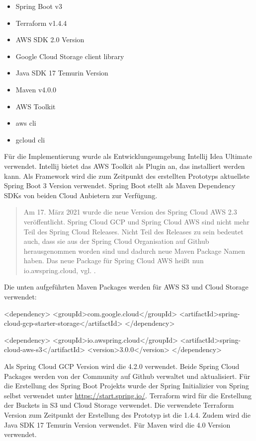 \begin{itemize}
	\item Spring Boot v3
	\item Terraform v1.4.4
	\item AWS SDK 2.0 Version
	\item Google Cloud Storage client library
	\item Java SDK 17 Temurin Version
	\item Maven v4.0.0
	\item AWS Toolkit
	\item aws cli
	\item gcloud cli
\end{itemize}

Für die Implementierung wurde als Entwicklungsumgebung Intellij Idea Ultimate verwendet. Intellij bietet das AWS Toolkit als Plugin an, das installiert werden kann. Als Framework wird die zum Zeitpunkt des erstellten Prototyps aktuellste Spring Boot 3 Version verwendet. Spring Boot stellt als Maven Dependency SDKs von beiden Cloud Anbietern zur Verfügung.

\begin{quote}
	Am 17. März 2021 wurde die neue Version des Spring Cloud AWS 2.3 veröffentlicht. Spring Cloud GCP und Spring Cloud AWS sind nicht mehr Teil des Spring Cloud Releases. Nicht Teil des Releases zu sein bedeutet auch, dass sie aus der Spring Cloud Organisation auf Github herausgenommen worden sind und dadurch neue Maven Package Namen haben. Das neue Package für Spring Cloud AWS heißt nun \glqq io.awspring.cloud\grqq, vgl. \cite{spring-cloud-announce}. 
\end{quote}

Die unten aufgeführten Maven Packages werden für AWS S3 und Cloud Storage verwendet:

\begin{code}
	<dependency>
        	<groupId>com.google.cloud</groupId>
        	<artifactId>spring-cloud-gcp-starter-storage</artifactId>
    </dependency> \end{code}

\begin{code}
	<dependency>
        	<groupId>io.awspring.cloud</groupId>
        	<artifactId>spring-cloud-aws-s3</artifactId>
        	<version>3.0.0</version>
    </dependency> \end{code}

Als Spring Cloud GCP Version wird die 4.2.0 verwendet. Beide Spring Cloud Packages werden von der Community auf Github verwaltet und aktualisiert. Für die Erstellung des Spring Boot Projekts wurde der Spring Initializier von Spring selbst verwendet unter \url{https://start.spring.io/}. Terraform wird für die Erstellung der Buckets in S3 und Cloud Storage verwendet. Die verwendete Terraform Version zum Zeitpunkt der Erstellung des Prototyp ist die 1.4.4. Zudem wird die Java SDK 17 Temurin Version verwendet. Für Maven wird die 4.0 Version verwendet.\\

